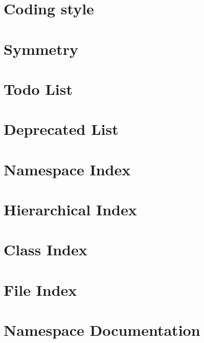 \documentclass[twoside]{book}
\newcommand{\+}{\discretionary{\mbox{\scriptsize$\hookleftarrow$}}{}{}}
\begin{document}
\chapter{Coding style}
\label{coding}
\hypertarget{coding}{}

\chapter{Symmetry}
\label{sym}
\hypertarget{sym}{}

\chapter{Todo List}
\label{todo}
\hypertarget{todo}{}

\chapter{Deprecated List}
\label{deprecated}
\hypertarget{deprecated}{}

\chapter{Namespace Index}

\chapter{Hierarchical Index}

\chapter{Class Index}

\chapter{File Index}

\chapter{Namespace Documentation}



\end{document}
